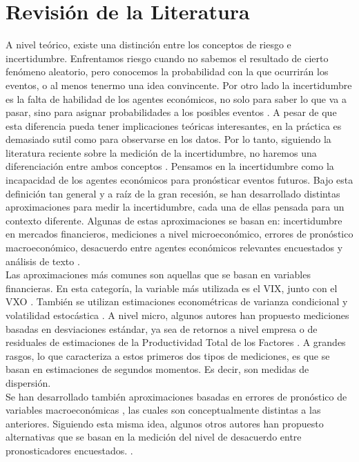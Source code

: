 \documentclass[11pt,a4paper]{article}
\begin{document}
\section{Revisión de la Literatura}
A nivel teórico, existe una distinción entre los conceptos de riesgo e incertidumbre. Enfrentamos riesgo cuando no sabemos el resultado de cierto fenómeno aleatorio, pero conocemos la probabilidad con la que ocurrirán los eventos, o al menos tenermo una idea convincente. Por otro lado la incertidumbre es la falta de habilidad de los agentes económicos, no solo para saber lo que va a pasar, sino para asignar probabilidades a los posibles eventos \citep{knight_1921}. A pesar de que esta diferencia pueda tener implicaciones teóricas interesantes, en la práctica es demasiado sutil como para observarse en los datos. Por lo tanto, siguiendo la literatura reciente sobre la medición de la incertidumbre, no haremos una diferenciación entre ambos conceptos \citep{bloom2014}. Pensamos en la incertidumbre como la incapacidad de los agentes económicos para pronósticar eventos futuros. Bajo esta definición tan general y a raíz de la gran recesión, se han desarrollado distintas aproximaciones para medir la incertidumbre, cada una de ellas pensada para un contexto diferente. Algunas de estas aproximaciones se basan en: incertidumbre en mercados financieros, mediciones a nivel microeconómico, errores de pronóstico macroeconómico, desacuerdo entre agentes económicos relevantes encuestados y análisis de texto \citep{ferrara_2018}. \\

Las aproximaciones más comunes son aquellas que se basan en variables financieras. En esta categoría, la variable más utilizada es el VIX, junto con el VXO \citep{bloom_2009}. También se utilizan estimaciones econométricas de varianza condicional \citep{ferrara_2014} y volatilidad estocástica \citep{carriero_2016}. A nivel micro, algunos autores han propuesto mediciones basadas en desviaciones estándar, ya sea de retornos a nivel empresa \citep{bloom_2007, gilchrist_2013} o de residuales de estimaciones de la Productividad Total de los Factores \citep{bloom_2009}. A grandes rasgos, lo que caracteriza a estos primeros dos tipos de mediciones, es que se basan en estimaciones de segundos momentos. Es decir, son medidas de dispersión. \\

Se han desarrollado también aproximaciones basadas en errores de pronóstico de variables macroeconómicas \citep{scotti_2016, jurado_2015}, las cuales son conceptualmente distintas a las anteriores. Siguiendo esta misma idea, algunos otros autores han propuesto alternativas que se basan en la medición del nivel de desacuerdo entre pronosticadores encuestados. \citep{bachmann_2013, lahiri_2010}.  \\
\end{document}
